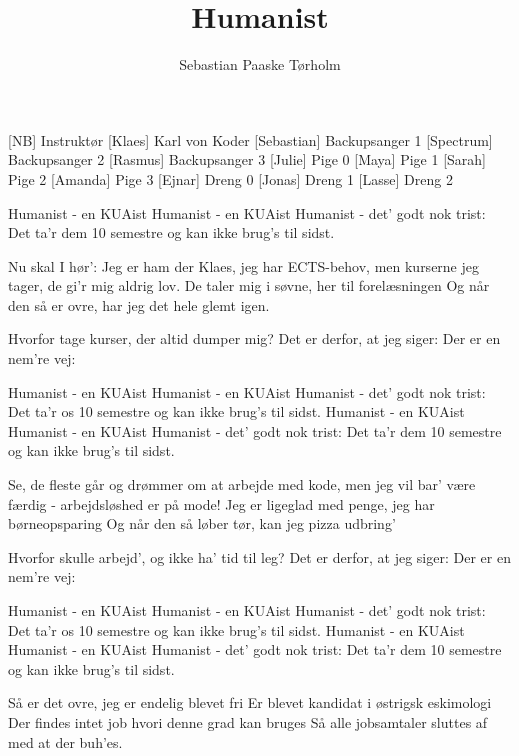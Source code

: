 \documentclass[a4paper,11pt]{article}
\title{Humanist}
\author{Sebastian Paaske Tørholm}
\begin{document}
\maketitle

\begin{roles}
[NB] Instruktør
[Klaes] Karl von Koder
[Sebastian] Backupsanger 1
[Spectrum] Backupsanger 2
[Rasmus] Backupsanger 3
[Julie] Pige 0
[Maya] Pige 1
[Sarah] Pige 2
[Amanda] Pige 3
[Ejnar] Dreng 0
[Jonas] Dreng 1
[Lasse] Dreng 2
\end{roles}

\begin{song}
     {
        Humanist - en KUAist
        Humanist - en KUAist
        Humanist - det’ godt nok trist:
        Det ta’r dem 10 semestre
        og kan ikke brug’s til sidst.
    }
%
     {
        Nu skal I hør':
        Jeg er ham der Klaes, jeg har ECTS-behov,
        men kurserne jeg tager, de gi’r mig aldrig lov.
        De taler mig i søvne, her til forelæsningen
        Og når den så er ovre, har jeg det hele glemt igen.

        Hvorfor tage kurser, der altid dumper mig?
        Det er derfor, at jeg siger: Der er en nem're vej:
    }
     {
        Humanist - en KUAist
        Humanist - en KUAist
        Humanist - det’ godt nok trist:
        Det ta’r os 10 semestre
        og kan ikke brug’s til sidst.
    }
     {
        Humanist - en KUAist
        Humanist - en KUAist
        Humanist - det’ godt nok trist:
        Det ta’r dem 10 semestre
        og kan ikke brug’s til sidst.
    }
%
     {
        Se, de fleste går og drømmer om at arbejde med kode,
        men jeg vil bar’ være færdig - arbejdsløshed er på mode!
        Jeg er ligeglad med penge, jeg har børneopsparing
        Og når den så løber tør, kan jeg pizza udbring’

        Hvorfor skulle arbejd’, og ikke ha’ tid til leg?
        Det er derfor, at jeg siger: Der er en nem're vej:
    }
     {
        Humanist - en KUAist
        Humanist - en KUAist
        Humanist - det’ godt nok trist:
        Det ta’r os 10 semestre
        og kan ikke brug’s til sidst.
    }
     {
        Humanist - en KUAist
        Humanist - en KUAist
        Humanist - det’ godt nok trist:
        Det ta’r dem 10 semestre
        og kan ikke brug’s til sidst.
    }
%
     {
        Så er det ovre, jeg er endelig blevet fri
        Er blevet kandidat i østrigsk eskimologi
        Der findes intet job hvori denne grad kan bruges
        Så alle jobsamtaler sluttes af med at der buh’es.

}
\end{song}
\end{document}
